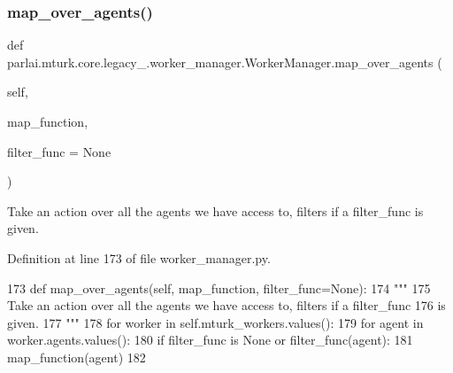 \subsubsection{\texorpdfstring{map\+\_\+over\+\_\+agents()}{map\_over\_agents()}}
{\footnotesize\ttfamily def parlai.\+mturk.\+core.\+legacy\+\_.\+worker\+\_\+manager.\+Worker\+Manager.\+map\+\_\+over\+\_\+agents (\begin{DoxyParamCaption}\item[{}]{self,  }\item[{}]{map\+\_\+function,  }\item[{}]{filter\+\_\+func = {\ttfamily None} }\end{DoxyParamCaption})}

\begin{DoxyVerb}Take an action over all the agents we have access to, filters if a filter_func
is given.
\end{DoxyVerb}
 

Definition at line 173 of file worker\+\_\+manager.\+py.


\begin{DoxyCode}
173     \textcolor{keyword}{def }map\_over\_agents(self, map\_function, filter\_func=None):
174         \textcolor{stringliteral}{"""}
175 \textcolor{stringliteral}{        Take an action over all the agents we have access to, filters if a filter\_func}
176 \textcolor{stringliteral}{        is given.}
177 \textcolor{stringliteral}{        """}
178         \textcolor{keywordflow}{for} worker \textcolor{keywordflow}{in} self.mturk\_workers.values():
179             \textcolor{keywordflow}{for} agent \textcolor{keywordflow}{in} worker.agents.values():
180                 \textcolor{keywordflow}{if} filter\_func \textcolor{keywordflow}{is} \textcolor{keywordtype}{None} \textcolor{keywordflow}{or} filter\_func(agent):
181                     map\_function(agent)
182 
\end{DoxyCode}
\mbox{\label{classparlai_1_1mturk_1_1core_1_1legacy__2018_1_1worker__manager_1_1WorkerManager_aa74b0ed37c36bb2351e2688b4347c3fa}} 
